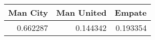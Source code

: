 \begin{tabular}{rrr}
\hline
   Man City &   Man United &   Empate \\
\hline
   0.662287 &     0.144342 & 0.193354 \\
\hline
\end{tabular}